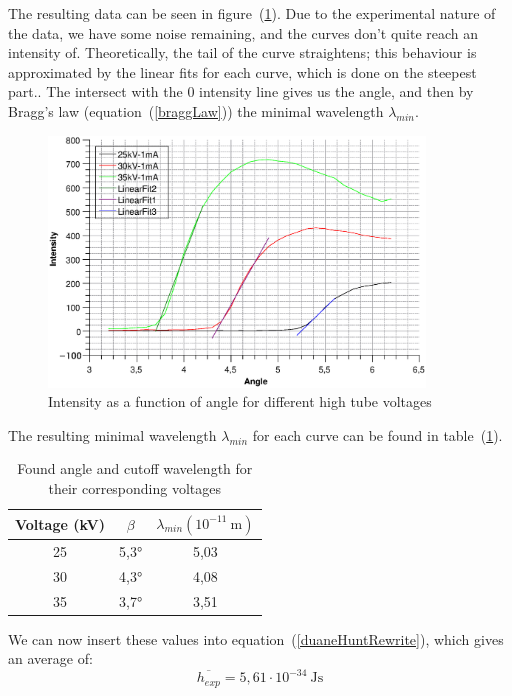 \documentclass{scrartcl}
\begin{document}
\noindent The resulting data can be seen in figure~(\ref{fig:duaneHunt}). Due to the experimental nature of the data, we have some noise remaining, and the curves don't quite reach an intensity of. Theoretically, the tail of the curve straightens; this behaviour is approximated by the linear fits for each curve, which is done on the steepest part.. The intersect with the 0 intensity line gives us the angle, and then by Bragg's law (equation~(\ref{braggLaw})) the minimal wavelength $\lambda_{min}$.

\begin{figure}[!ht]
    \centering
    \includegraphics[width=10cm]{DuaneHunt_2.eps}
    \caption{Intensity as a function of angle for different high tube voltages}
    \label{fig:duaneHunt}
\end{figure}


\noindent The resulting minimal wavelength $\lambda_{min}$ for each curve can be found in table~(\ref{tab:duaneHuntMinWavelength}).

\begin{table}[!ht]
    \centering
    \begin{tabular}{c|c|c}
    Voltage (kV) & $\beta$  &  $\lambda_{min} (10^{-11} \ \text{m})$  \\ \hline
    25  & 5,3° & 5,03 \\
    30 & 4,3° &  4,08 \\
    35 & 3,7° &  3,51     
    \end{tabular}
    \caption{ Found angle and cutoff wavelength for their corresponding voltages}
    \label{tab:duaneHuntMinWavelength}
    \end{table}
\FloatBarrier

\noindent We can now insert these values into equation~(\ref{duaneHuntRewrite}), which gives an average of: \[\boxed{\overline{h_{exp}} = 5,61 \cdot 10^{-34}\ \text{Js}}\]
\end{document}

